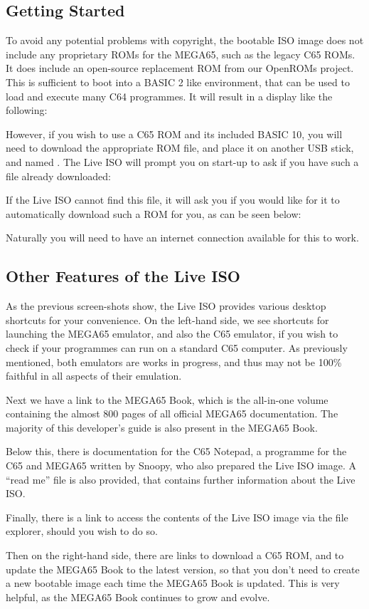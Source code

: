 \subsection{Getting Started}

To avoid any potential problems with copyright, the bootable ISO image does not
include any proprietary ROMs for the MEGA65, such as the legacy C65 ROMs.
It does include an open-source replacement ROM from our OpenROMs project.
This is sufficient to boot into a BASIC 2 like environment, that can be used
to load and execute many C64 programmes.  It will result in a display like the following:


However, if you wish to use a C65
ROM and its included BASIC 10, you will need to download the appropriate ROM file,
and place it on another USB stick, and named . The Live ISO
will prompt you on start-up to ask if you have such a file already downloaded:


If the Live ISO cannot find this file, it will ask you if you would like
for it to automatically download such a ROM for you, as can be seen below:


Naturally you will need to have an internet connection available for this to work.

\subsection{Other Features of the Live ISO}

As the previous screen-shots show, the Live ISO provides various desktop shortcuts
for your convenience.  On the left-hand side, we see shortcuts for launching the
MEGA65 emulator, and also the C65 emulator, if you wish to check if your programmes
can run on a standard C65 computer.  As previously mentioned, both emulators are
works in progress, and thus may not be 100\% faithful in all aspects of their emulation.

Next we have a link to the MEGA65 Book, which is the all-in-one volume containing the
almost 800 pages of all official MEGA65 documentation.
The majority of this developer's guide is also present in the MEGA65 Book.

Below this, there is documentation for the C65 Notepad, a programme for the C65 and MEGA65
written by Snoopy, who also prepared the Live ISO image.  A ``read me'' file is also provided,
that contains further information about the Live ISO.

Finally, there is a link to access the contents of the Live ISO image via the file
explorer, should you wish to do so.

Then on the right-hand side, there are links to download a C65 ROM, and to update the
MEGA65 Book to the latest version, so that you don't need to create a new bootable image
each time the MEGA65 Book is updated.  This is very helpful, as the MEGA65 Book continues
to grow and evolve.

